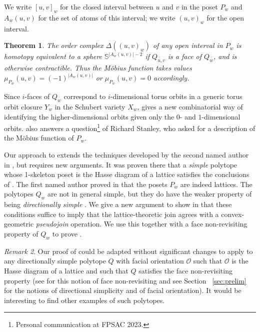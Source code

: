 \documentclass[12pt]{amsart}
\theoremstyle{plain}
\newtheorem{thm}{Theorem}[section]
\theoremstyle{definition}
\theoremstyle{remark}
\newtheorem{remark}[thm]{Remark}
\renewcommand{\SS}{\mathbb{S}}
\begin{document}
We write $[u,v]_w$ for the closed interval between $u$ and $v$ in the poset $P_w$ and $A_w(u,v)$ for the set of atoms of this interval; we write $(u,v)_w$ for the open interval. 

\begin{thm}
\label{thm:intro-topology}
The order complex $\Delta((u,v)_w)$ of any open interval in $P_w$ is homotopy equivalent 
to a sphere $\SS^{|A_w(u,v)|-2}$ if $Q_{u,v}$ is a face of $Q_w$, and is otherwise contractible. Thus the M\"{o}bius function takes values $\mu_{P_w}(u,v) = (-1)^{|A_w(u,v)|}$ or $\mu_{P_w}(u,v)=0$ accordingly.
\end{thm}

Since $i$-faces of $Q_w$ correspond to $i$-dimensional torus orbits in a generic torus orbit closure $Y_w$ in the Schubert variety $X_w$,  gives a new combinatorial way of identifying the higher-dimensional orbits given only the $0$- and $1$-dimensional orbits.  also answers a question\footnote{Personal communication at FPSAC 2023.} of Richard Stanley, who asked for a description of the M\"{o}bius function of $P_w$. 

Our approach to  extends the techniques developed by the second named author in \cite{He}, but requires new arguments. It was proven there that a \emph{simple} polytope whose 1-skeleton poset is the Hasse diagram of a lattice satisfies the conclusions of . The first named author proved in \cite{Ga} that the posets $P_w$ are indeed lattices. The polytopes $Q_w$ are not in general simple, but they do have the weaker property of being \emph{directionally simple} \cite{Ga}. We give a new argument to show in  that these conditions suffice to imply that the lattice-theoretic join agrees with a convex-geometric \emph{pseudojoin} operation. We use this together with a face non-revisiting property of $Q_w$ to prove . 

\begin{remark}
Our proof of  could be adapted without significant changes to apply to any directionally simple polytope $Q$ with facial orientation $\mathcal{O}$ such that $\mathcal{O}$ is the Hasse diagram of a lattice and such that $Q$ satisfies the face non-revisiting property (see  for this notion of face non-revisiting  and see Section ~\ref{sec:prelim} for the notions of directional simplicity and of facial orientation). It would be interesting to find other examples of such polytopes.  
\end{remark}
\end{document}
